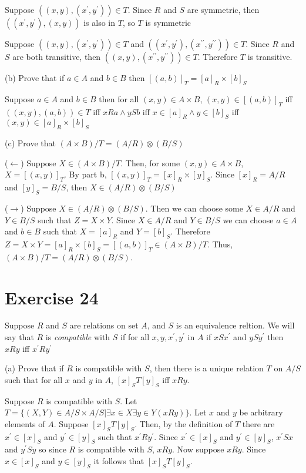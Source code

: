 \documentclass[11pt]{article}
\newcommand{\dprime}{{\prime \prime}}
\begin{document}
Suppose $((x,y), (x^\prime, y^\prime)) \in T$. Since $R$ and $S$ are symmetric,
then $((x^\prime, y^\prime), (x,y))$ is also in $T$, so $T$ is symmetric

Suppose $((x,y), (x^\prime, y^\prime)) \in T$ and 
$((x^\prime, y^\prime), (x^\dprime, y^\dprime)) \in T$. Since $R$ and $S$ are
both transitive, then $((x,y), (x^\dprime, y^\dprime)) \in T$. Therefore
$T$ is transitive.

\noindent (b) Prove that if $a \in A$ and $b \in B$ then $[(a,b)]_T = [a]_R \times [b]_S$

Suppose $a \in A$ and $b \in B$ then for all $(x,y) \in A \times B$,
$(x,y) \in [(a,b)]_T$ iff 
$((x,y), (a,b)) \in T$ iff 
$xRa \wedge ySb$ iff 
$x \in [a]_R \wedge y \in [b]_S$ iff 
$(x,y) \in [a]_R \times [b]_S$

\noindent (c) Prove that $(A \times B)/T = (A/R) \otimes (B/S)$

($\leftarrow$) Suppose $X \in (A \times B)/T$. 
Then, for some $(x,y) \in A \times B$, $X = [(x,y)]_T$. By part b,
$[(x,y)]_T = [x]_R \times [y]_S$. Since $[x]_R = A/R$ and $[y]_S = B/S$, 
then $X \in (A/R) \otimes (B/S)$

($\rightarrow$) Suppose $X \in (A/R) \otimes (B/S)$. Then we can choose some 
$X \in A/R$ and $Y \in B/S$ such that $Z = X \times Y$. Since $X \in A/R$
and $Y \in B/S$ we can choose $a \in A$ and $b \in B$ such that $X = [a]_R$ 
and $Y = [b]_S$. Therefore $Z = X \times Y = [a]_R \times [b]_S = [(a,b)]_T 
\in (A \times B) / T$. Thus, $(A \times B) / T = (A / R) \otimes (B/S)$.

\section*{Exercise 24}

Suppose $R$ and $S$ are relations on set $A$, and $S$ is an equivalence reltion.
We will say that $R$ is \textit{compatible} with $S$ if for all $x, y, x^\prime,
y^\prime$ in $A$ if $xSx^\prime$ and $ySy^\prime$ then $xRy$ iff $x^\prime R y^\prime$

\noindent (a) Prove that if $R$ is compatible with $S$, then there is a unique 
relation $T$ on $A/S$ such that for all $x$ and $y$ in $A$, $[x]_S T [y]_S$
iff $xRy$.

Suppose $R$ is compatible with $S$. Let 
$T = \{(X, Y) \in A/S \times A/S | \exists x \in X \exists y \in Y (xRy)\}$.
Let $x$ and $y$ be arbitrary elements of $A$. Suppose $[x]_S T [y]_S$. Then, by 
the definition of $T$ there are $x^\prime \in [x]_S$ and $y^\prime \in [y]_S$
such that $x^\prime R y^\prime$. Since $x^\prime \in [x]_S$ and 
$y^\prime \in [y]_S$, $x^\prime Sx$ and $y^\prime S y$ so since $R$ is 
compatible with $S$, $xRy$. Now suppose $xRy$. Since $x \in [x]_S$ and 
$y \in [y]_S$ it follows that $[x]_S T [y]_S$.
\end{document}
